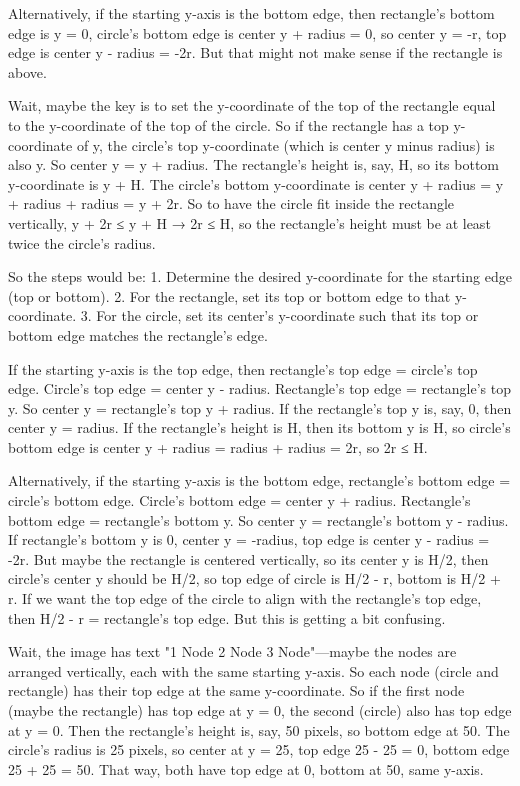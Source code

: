 Alternatively, if the starting y-axis is the bottom edge, then rectangle's bottom edge is y = 0, circle's bottom edge is center y + radius = 0, so center y = -r, top edge is center y - radius = -2r. But that might not make sense if the rectangle is above. 

Wait, maybe the key is to set the y-coordinate of the top of the rectangle equal to the y-coordinate of the top of the circle. So if the rectangle has a top y-coordinate of y, the circle's top y-coordinate (which is center y minus radius) is also y. So center y = y + radius. The rectangle's height is, say, H, so its bottom y-coordinate is y + H. The circle's bottom y-coordinate is center y + radius = y + radius + radius = y + 2r. So to have the circle fit inside the rectangle vertically, y + 2r ≤ y + H → 2r ≤ H, so the rectangle's height must be at least twice the circle's radius. 

So the steps would be: 1. Determine the desired y-coordinate for the starting edge (top or bottom). 2. For the rectangle, set its top or bottom edge to that y-coordinate. 3. For the circle, set its center's y-coordinate such that its top or bottom edge matches the rectangle's edge. 

If the starting y-axis is the top edge, then rectangle's top edge = circle's top edge. Circle's top edge = center y - radius. Rectangle's top edge = rectangle's top y. So center y = rectangle's top y + radius. If the rectangle's top y is, say, 0, then center y = radius. If the rectangle's height is H, then its bottom y is H, so circle's bottom edge is center y + radius = radius + radius = 2r, so 2r ≤ H. 

Alternatively, if the starting y-axis is the bottom edge, rectangle's bottom edge = circle's bottom edge. Circle's bottom edge = center y + radius. Rectangle's bottom edge = rectangle's bottom y. So center y = rectangle's bottom y - radius. If rectangle's bottom y is 0, center y = -radius, top edge is center y - radius = -2r. But maybe the rectangle is centered vertically, so its center y is H/2, then circle's center y should be H/2, so top edge of circle is H/2 - r, bottom is H/2 + r. If we want the top edge of the circle to align with the rectangle's top edge, then H/2 - r = rectangle's top edge. But this is getting a bit confusing. 

Wait, the image has text "1 Node 2 Node 3 Node"—maybe the nodes are arranged vertically, each with the same starting y-axis. So each node (circle and rectangle) has their top edge at the same y-coordinate. So if the first node (maybe the rectangle) has top edge at y = 0, the second (circle) also has top edge at y = 0. Then the rectangle's height is, say, 50 pixels, so bottom edge at 50. The circle's radius is 25 pixels, so center at y = 25, top edge 25 - 25 = 0, bottom edge 25 + 25 = 50. That way, both have top edge at 0, bottom at 50, same y-axis. 

